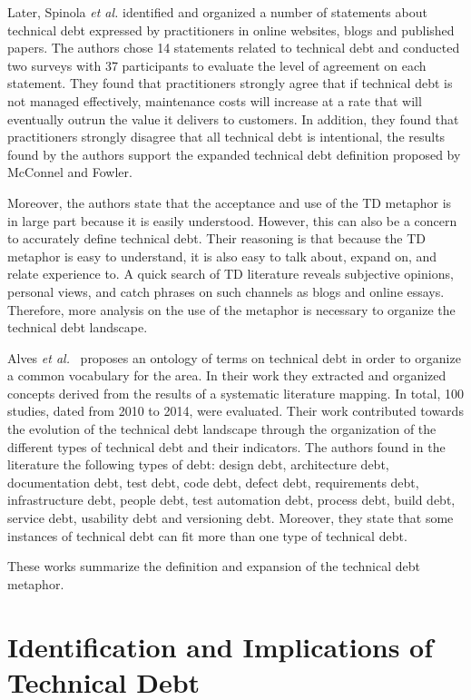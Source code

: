 Later, Spinola \textit{et al.} \cite{Spinola2013MTD} identified and organized a number of statements about technical debt expressed by practitioners in online websites, blogs and published papers. The authors chose 14 statements related to technical debt and conducted two surveys with 37 participants to evaluate the level of agreement on each statement. 
They found that practitioners strongly agree that if technical debt is not managed effectively, maintenance costs will increase at a rate that will eventually outrun the value it delivers to customers. In addition, they found that practitioners strongly disagree that all technical debt is intentional, the results found by the authors support the expanded technical debt definition proposed by McConnel and Fowler. 

Moreover, the authors state that the acceptance and use of the TD metaphor is in large part because it is easily understood. However, this can also be a concern to accurately define technical debt. Their reasoning is that because the TD metaphor is easy to understand, it is also easy to talk about, expand on, and relate experience to. A quick search of TD literature reveals subjective opinions, personal views, and catch phrases on such channels as blogs and online essays. Therefore, more analysis on the use of the metaphor is necessary to organize the technical debt landscape.

Alves \textit{et al.}~\cite{Alves2014MTD,Alves2016IST} proposes an ontology of terms on technical debt in order to organize a common vocabulary for the area. In their work they extracted and organized concepts derived from the results of a systematic literature mapping. In total, 100 studies, dated from 2010 to 2014, were evaluated. Their work contributed towards the evolution of the technical debt landscape through the organization of the different types of technical debt and their indicators. The authors found in the literature the following types of debt: design debt, architecture debt, documentation debt, test debt, code debt, defect debt, requirements debt, infrastructure debt, people debt, test automation debt, process debt, build debt, service debt, usability debt and versioning debt. Moreover, they state that some instances of technical debt can fit more than one type of technical debt. 

These works summarize the definition and expansion of the technical debt metaphor. 

\section{Identification and Implications of Technical Debt}

